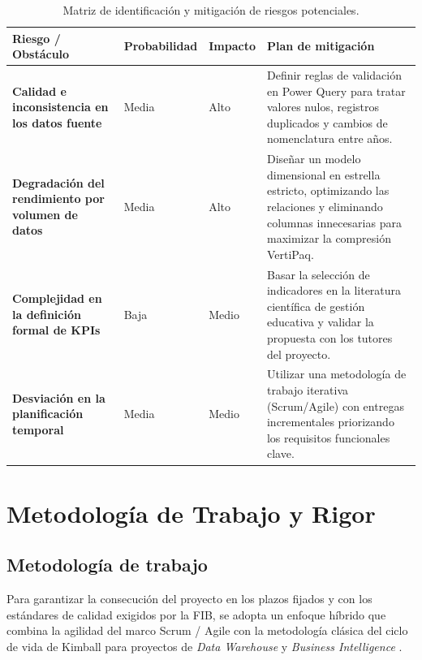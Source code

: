 \documentclass[12pt, a4paper, twoside]{report}
\begin{document}
\begin{table}[H]
\centering
\caption{Matriz de identificación y mitigación de riesgos potenciales.}
\label{tab:matriz_riesgos}
\footnotesize
\renewcommand{\arraystretch}{0.95}
\begin{tabularx}{\textwidth}{@{} p{2.8cm} p{2.2cm} p{1.6cm} X @{}}
\toprule
\textbf{Riesgo / Obstáculo} & \textbf{Probabilidad} & \textbf{Impacto} & \textbf{Plan de mitigación} \\ \midrule
\textbf{Calidad e inconsistencia en los datos fuente} & Media & Alto & Definir reglas de validación en Power Query para tratar valores nulos, registros duplicados y cambios de nomenclatura entre años. \\ \addlinespace[2pt]
\textbf{Degradación del rendimiento por volumen de datos} & Media & Alto & Diseñar un modelo dimensional en estrella estricto, optimizando las relaciones y eliminando columnas innecesarias para maximizar la compresión VertiPaq. \\ \addlinespace[2pt]
\textbf{Complejidad en la definición formal de KPIs} & Baja & Medio & Basar la selección de indicadores en la literatura científica de gestión educativa \cite{niven2008balanced} y validar la propuesta con los tutores del proyecto. \\ \addlinespace[2pt]
\textbf{Desviación en la planificación temporal} & Media & Medio & Utilizar una metodología de trabajo iterativa (Scrum/Agile) con entregas incrementales priorizando los requisitos funcionales clave. \\ \bottomrule
\end{tabularx}
\end{table}



\chapter{Metodología de Trabajo y Rigor}

\section{Metodología de trabajo}
Para garantizar la consecución del proyecto en los plazos fijados y con los estándares de calidad exigidos por la FIB, se adopta un enfoque híbrido que combina la agilidad del marco Scrum / Agile \cite{schwaber2020scrum} con la metodología clásica del ciclo de vida de Kimball para proyectos de \textit{Data Warehouse} y \textit{Business Intelligence} \cite{kimball2013data}.
\end{document}
